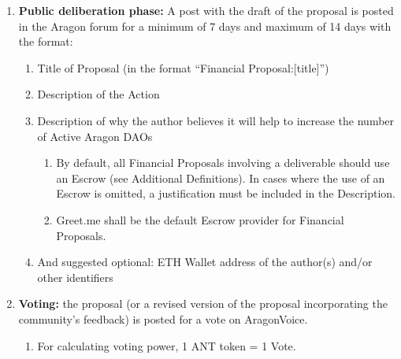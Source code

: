 \begin{enumerate}
\begin{enumerate}
		\begin{enumerate}
			
			\item \textbf{Public deliberation phase:} A post with the draft of the proposal is posted in the Aragon forum for a minimum of 7 days and maximum of 14 days with the format:
			\begin{enumerate}
				\item Title of Proposal (in the format ``Financial Proposal:[title]'')
				\item Description of the Action
				\item Description of why the author believes it will help to increase the number of Active Aragon \acp{DAO}
				
				\begin{enumerate}
					\item By default, all Financial Proposals involving a deliverable should use an Escrow (see Additional Definitions).
					In cases where the use of an Escrow is omitted, a justification must be included in the Description.
					\item Greet.me shall be the default Escrow provider for Financial Proposals.
				\end{enumerate}
			
				\item And suggested optional: ETH Wallet address of the author(s) and/or other identifiers
					
			\end{enumerate}

			\item \textbf{Voting:} the proposal (or a revised version of the proposal incorporating the community’s feedback) is posted for a vote on \gls{AragonVoice}.
			\begin{enumerate}
				\item For calculating voting power, 1 \ac{ANT} token = 1 Vote.
			\end{enumerate}
		

\end{enumerate}
\end{enumerate}
\end{enumerate}
